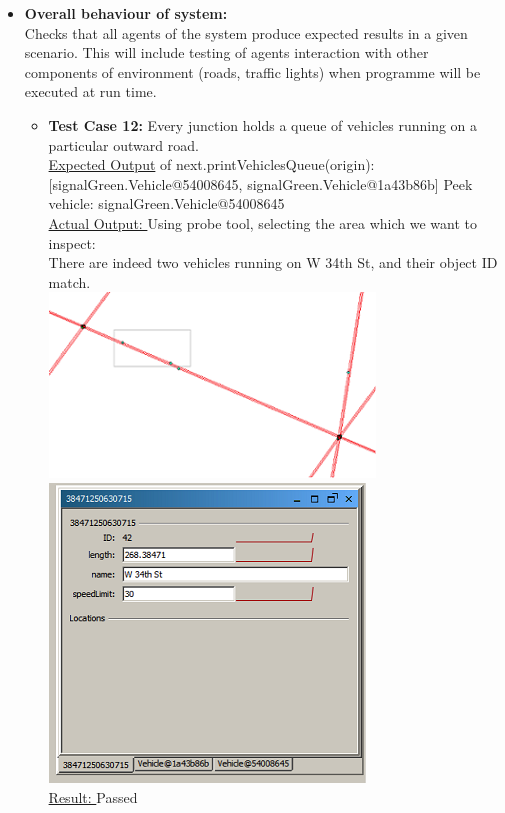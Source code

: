 \documentclass[11pt]{article}
\begin{document}
\begin{enumerate}
\begin{itemize}
\item \textbf{Overall behaviour of system: }\hfill \\
		Checks that all agents of the system produce expected results in a given scenario. This will include testing of agents interaction with other components of environment (roads, traffic lights) when programme will be executed at run time.\hfill \\
	\begin{itemize}
	\item	\textbf{Test Case 12:} Every junction holds a queue of vehicles running on a particular outward road.\hfill \\
		\underline{Expected Output} of next.printVehiclesQueue(origin):[signalGreen.Vehicle@54008645, signalGreen.Vehicle@1a43b86b] Peek vehicle: signalGreen.Vehicle@54008645\hfill \\
		\underline{Actual Output: }Using probe tool, selecting the area which we want to inspect:\hfill \\
		There are indeed two vehicles running on W 34th St, and their object ID match.\hfill \\
		\includegraphics[scale=0.7]{RoadNetwork}
		\includegraphics{Sim}\hfill \\
			
		\underline{Result: }Passed
			

\end{itemize}
\end{itemize}
\end{enumerate}
\end{document}
